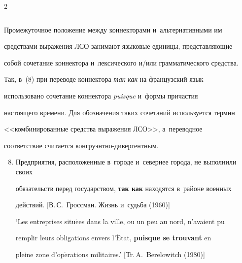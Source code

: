 \begin{multicols}{2}
\begin{table}[b]
\begin{center}
\begin{tabular}{|c|l|c|}
\end{tabular}


\end{center}


\end{table}














Промежуточное положение между коннекторами и~альтернативными им 


средствами выражения ЛСО занимают языковые единицы, пред\-став\-ля\-ющие 


собой сочетание коннектора и~лексического и/или грамматического средства. 


Так, в~(8) при переводе коннектора \textit{так как} на французский язык\linebreak 


использовано сочетание коннектора \textit{puisque} и~формы причастия 


настоящего времени. Для обо\-значения таких сочетаний используется термин 


<<комбинированные средства выражения ЛСО>>, а~переводное 


соответствие считается кон\-гру\-энт\-но-ди\-вер\-гент\-ным.


{\small


\begin{enumerate}[(1)]


\setcounter{enumi}{7}


\item Предприятия, расположенные в~городе и~севернее города, не выполнили своих 


обязательств перед государством, \textbf{так как} находятся в~районе военных 


действий. [В.\,С.~Гроссман. Жизнь и~судьба (1960)]





`Les entreprises situ$\acute{\mbox{e}}$es dans la ville, ou un peu au nord, n'avaient pu 


remplir leurs obligations envers l'$\acute{\mbox{E}}$tat, \textbf{puisque se trouvant} en 


pleine zone d'op$\acute{\mbox{e}}$rations militaires.' [Tr.\,A.~Berelowitch (1980)]


\end{enumerate}


}
\end{multicols}
